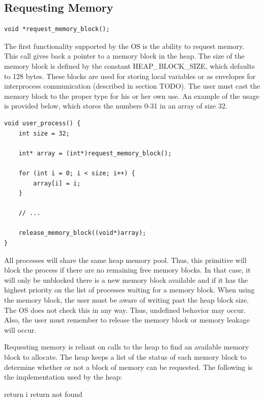 \documentclass[12pt,twocolumn]{report}
\begin{document}
\subsection{Requesting Memory}
\label{sec:request_memory}
\begin{lstlisting}
void *request_memory_block();
\end{lstlisting}
\par The first functionality supported by the OS is the ability to request memory. This call gives back a pointer to a memory block in the heap. The size of the memory block is defined by the constant HEAP\_BLOCK\_SIZE, which defaults to 128 bytes. These blocks are used for storing local variables or as envelopes for interprocess communication (described in section TODO). The user must cast the memory block to the proper type for his or her own use. An example of the usage is provided below, which stores the numbers 0-31 in an array of size 32.
\begin{lstlisting}
void user_process() {
    int size = 32;

    int* array = (int*)request_memory_block();

    for (int i = 0; i < size; i++) {
        array[i] = i;
    }

    // ...

    release_memory_block((void*)array);
}
\end{lstlisting}

\par All processes will share the same heap memory pool. Thus, this primitive will block the process if there are no remaining free memory blocks. In that case, it will only be unblocked there is a new memory block available and if it has the highest priority on the list of processes waiting for a memory block. When using the memory block, the user must be aware of writing past the heap block size. The OS does not check this in any way. Thus, undefined behavior may occur. Also, the user must remember to release the memory block or memory leakage will occur.

\par Requesting memory is reliant on calls to the heap to find an available memory block to allocate. The heap keeps a list of the status of each memory block to determine whether or not a block of memory can be requested. The following is the implementation used by the heap:
\begin{algorithmic}
        \State return i
      \EndIf
    \EndFor
  \State return not found
  \EndFunction
\end{algorithmic}
\end{document}
